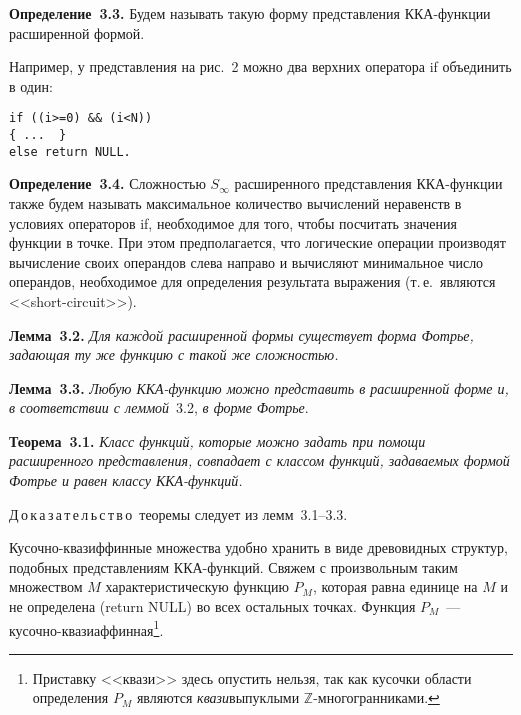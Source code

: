 \begin{multicols}{2}
\smallskip

\noindent
\textbf{Определение~3.3.}
Будем называть такую форму представления ККА-функции расширенной формой.

\smallskip

Например, у представления на рис.~2 можно два верхних оператора if объединить в один:
\begin{verbatim}
if ((i>=0) && (i<N))
{ ...  }
else return NULL.
\end{verbatim}

\smallskip

\noindent
\textbf{Определение~3.4.}
Сложностью $S_\infty$ расширенного представления ККА-функции также
будем называть максимальное количество вычислений неравенств в
условиях операторов if, необходимое для того, чтобы посчитать
значения функции в точке. При этом предполагается, что логические
операции производят вычисление своих операндов слева направо и
вычисляют минимальное число операндов, необходимое для определения
результата выражения (т.\,е.\ являются <<short-circuit>>).

\smallskip

\smallskip

\noindent
\textbf{Лемма~3.2.}
\textit{Для каждой расширенной формы существует форма Фотрье, задающая ту же 
функцию с такой же сложностью.}


\smallskip


\noindent
\textbf{Лемма~3.3.}
\textit{Любую ККА-функцию можно представить в расширенной форме и, в соответствии с леммой}~3.2,
\textit{в форме Фотрье}.

\smallskip

\noindent
\textbf{Теорема~3.1.}
\textit{Класс функций, которые можно задать при помощи расширенного представления, совпадает с классом функций, задаваемых формой
Фотрье и равен классу ККА-функций.}


\smallskip

\noindent
Д\,о\,к\,а\,з\,а\,т\,е\,л\,ь\,с\,т\,в\,о\ теоремы следует из лемм~3.1--3.3.

\smallskip

Кусочно-квазиффинные множества удобно хранить в виде древовидных структур,
подобных представлениям ККА-функ\-ций. Свяжем с произвольным таким
множеством $M$ характеристическую функцию $P_M$, которая равна
единице на $M$ и не определена (return NULL) во всех остальных
точках. Функция $P_M$~--- ку\-соч\-но-ква\-зи\-аф\-фин\-ная\footnote{Приставку
<<квази>> здесь опустить нельзя, так как кусочки области определения
$P_M$ являются \textit{квази}выпуклыми
$\mathbb{Z}$-мно\-го\-гран\-ни\-ками.}.


\end{multicols}
